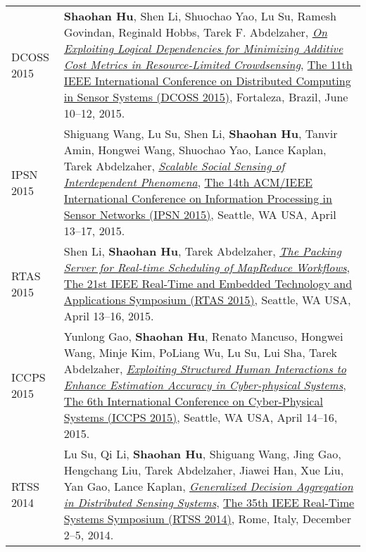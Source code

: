 \begin{longtabu}{p{.51\sectionwidth} p{.78\resumewidth}}
{\sc DCOSS 2015}\hypertarget{hu2015dcoss}{} &
\textbf{Shaohan Hu}, Shen Li, Shuochao Yao, Lu Su, Ramesh Govindan, Reginald Hobbs, Tarek F. Abdelzaher,
\href{http://ieeexplore.ieee.org/document/7165037}{\emph{On Exploiting Logical Dependencies for Minimizing Additive Cost Metrics in Resource-Limited Crowdsensing}},
\href{http://www.dcoss.org/}{\textsf{The 11th IEEE International Conference on Distributed Computing in Sensor Systems (DCOSS 2015)}},
Fortaleza, Brazil, June 10--12, 2015. \\

{\sc IPSN 2015}\hypertarget{wang2015ipsn}{} &
Shiguang Wang, Lu Su, Shen Li, \textbf{Shaohan Hu}, Tanvir Amin, Hongwei Wang, Shuochao Yao, Lance Kaplan, Tarek Abdelzaher,
\href{http://dl.acm.org/citation.cfm?id=2737114}{\emph{Scalable Social Sensing of Interdependent Phenomena}},
\href{http://ipsn.acm.org/2015/}{\textsf{The 14th ACM/IEEE International Conference on Information Processing in Sensor Networks (IPSN 2015)}},
Seattle, WA USA, April 13--17, 2015. \\

{\sc RTAS 2015}\hypertarget{li2015rtas}{} &
Shen Li, \textbf{Shaohan Hu}, Tarek Abdelzaher,
\href{http://ieeexplore.ieee.org/document/7108416}{\emph{The Packing Server for Real-time Scheduling of MapReduce Workflows}},
\href{http://2015.rtas.org/}{\textsf{The 21st IEEE Real-Time and Embedded Technology and Applications Symposium (RTAS 2015)}},
Seattle, WA USA, April 13--16, 2015. \\

{\sc ICCPS 2015}\hypertarget{gao2015iccps}{} &
Yunlong Gao, \textbf{Shaohan Hu}, Renato Mancuso, Hongwei Wang, Minje Kim, PoLiang Wu, Lu Su, Lui Sha, Tarek Abdelzaher,
\href{http://dl.acm.org/citation.cfm?id=2735960.2735965}{\emph{Exploiting Structured Human Interactions to Enhance Estimation Accuracy in Cyber-physical Systems}},
\href{http://iccps.acm.org/2015/}{\textsf{The 6th International Conference on Cyber-Physical Systems (ICCPS 2015)}},
Seattle, WA USA, April 14--16, 2015. \\

{\sc RTSS 2014}\hypertarget{su2014rtss}{} &
Lu Su, Qi Li, \textbf{Shaohan Hu}, Shiguang Wang, Jing Gao, Hengchang Liu, Tarek Abdelzaher, Jiawei Han, Xue Liu, Yan Gao, Lance Kaplan,
\href{http://ieeexplore.ieee.org/document/7010369}{\emph{Generalized Decision Aggregation in Distributed Sensing Systems}},
\href{http://2014.rtss.org/}{\textsf{The 35th IEEE Real-Time Systems Symposium (RTSS 2014)}},
Rome, Italy, December 2--5, 2014. \\


\end{longtabu}
